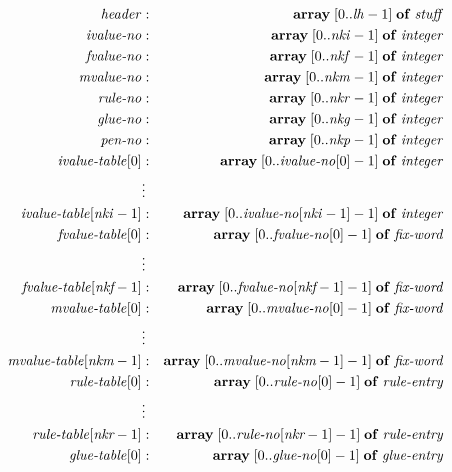 \documentclass[fleqn]{article}
\newcommand{\myit}[1]{\mbox{\emph{#1}}}
\begin{document}
\begin{eqnarray*}
\myit{header} & : &
     \mathbf{array}\;[0..\myit{lh}-1]\;\mathbf{of}\;\myit{stuff}\\
\myit{ivalue-no} & : &
     \mathbf{array}\;[0..\myit{nki}-1]\;\mathbf{of}\;\myit{integer}\\
\myit{fvalue-no} & : &
     \mathbf{array}\;[0..\myit{nkf}-1]\;\mathbf{of}\;\myit{integer}\\
\myit{mvalue-no} & : &
     \mathbf{array}\;[0..\myit{nkm}-1]\;\mathbf{of}\;\myit{integer}\\
\myit{rule-no} & : &
     \mathbf{array}\;[0..\myit{nkr}-1]\;\mathbf{of}\;\myit{integer}\\
\myit{glue-no} & : &
     \mathbf{array}\;[0..\myit{nkg}-1]\;\mathbf{of}\;\myit{integer}\\
\myit{pen-no} & : &
     \mathbf{array}\;[0..\myit{nkp}-1]\;\mathbf{of}\;\myit{integer}\\
\myit{ivalue-table}[0] & : &
     \mathbf{array}\;[0..\myit{ivalue-no}[0]-1]\;
     \mathbf{of}\;\myit{integer}\\
& \vdots\\
\myit{ivalue-table}[\myit{nki}-1] & : &
     \mathbf{array}\;[0..\myit{ivalue-no}[\myit{nki}-1]-1]\;
     \mathbf{of}\;\myit{integer}\\
\myit{fvalue-table}[0] & : &
     \mathbf{array}\;[0..\myit{fvalue-no}[0]-1]\;
     \mathbf{of}\;\myit{fix-word}\\
& \vdots\\
\myit{fvalue-table}[\textit{nkf}-1] & : &
     \mathbf{array}\;[0..\myit{fvalue-no}[\textit{nkf}-1]-1]\;
     \mathbf{of}\;\myit{fix-word}\\
\myit{mvalue-table}[0] & : &
     \mathbf{array}\;[0..\myit{mvalue-no}[0]-1]\;
     \mathbf{of}\;\myit{fix-word}\\
& \vdots\\
\myit{mvalue-table}[\textit{nkm}-1] & : &
     \mathbf{array}\;[0..\myit{mvalue-no}[\textit{nkm}-1]-1]\;
     \mathbf{of}\;\myit{fix-word}\\
\myit{rule-table}[0] & : &
     \mathbf{array}\;[0..\myit{rule-no}[0]-1]\;
     \mathbf{of}\;\myit{rule-entry}\\
& \vdots\\
\myit{rule-table}[\textit{nkr}-1] & : &
     \mathbf{array}\;[0..\myit{rule-no}[\textit{nkr}-1]-1]\;
     \mathbf{of}\;\myit{rule-entry}\\
\myit{glue-table}[0] & : &
     \mathbf{array}\;[0..\myit{glue-no}[0]-1]\;
     \mathbf{of}\;\myit{glue-entry}\\

\end{eqnarray*}
\end{document}
